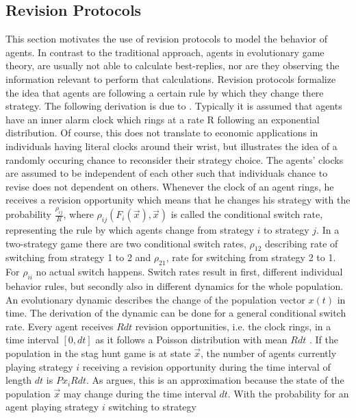 \subsection{Revision Protocols}
\label{sec:revisionprotocols}
This section motivates the use of revision protocols to
model the behavior of agents.
In contrast to the traditional approach, agents in evolutionary game theory, 
are usually not able to calculate best-replies, 
nor are they observing the information relevant
to perform that calculations.
Revision protocols formalize the idea that agents are following a certain
rule by which they change there strategy. 
The following derivation is due to \textcite{sandholm_population_2010}. 
Typically it is assumed that agents have an inner alarm clock 
which rings at a rate R following an exponential distribution. 
Of course, this does not translate 
to economic applications in individuals having literal clocks around their
wrist, but illustrates the idea of a randomly occuring chance to reconsider
their strategy choice.
The agents' clocks are assumed to be independent of each other such that
individuals chance to revise does not dependent on others.
Whenever the clock of an agent rings, he
receives a revision opportunity which means that he changes his strategy
with the probability $\frac{\rho_{ij}}{R}$, where
$\rho_{ij}(F_i(\vec{x}),\vec{x})$ is called the conditional switch rate,
representing the rule by which agents change from strategy 
$i$ to strategy $j$. 
In a two-strategy game there are two conditional switch rates, $\rho_{12}$ 
describing rate of switching from strategy 1 to 2 and $\rho_{21}$, 
rate for switching from strategy 2 to 1. For $\rho_{ii}$ no actual switch 
happens.
Switch rates result in first, different individual behavior rules, but 
secondly also in different dynamics for the whole population. An evolutionary
dynamic describes the change of the population vector $x(t)$ in time. 
The derivation of the dynamic can be done for a general conditional switch 
rate.
Every agent receives $R dt$ revision opportunities, i.e. the clock rings, 
in a time interval $[0,dt]$ as it follows a Poisson distribution with
mean $Rdt$ \parencite[123]{sandholm_population_2010}. 
If the population in the stag hunt game is at state $\vec{x}$, the number 
of agents currently playing strategy $i$ receiving a revision opportunity 
during the time interval of length $dt$ is $Px_i R dt$. As 
\textcite{sandholm_population_2010} argues, this is an approximation because
the state of the population $\vec{x}$ may change during the time interval $dt$.
With the probability for an agent playing strategy $i$ switching to strategy
